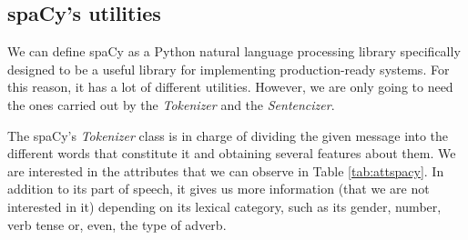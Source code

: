 \subsection{spaCy's utilities}\label{ssect:spacyut}
We can define spaCy as a Python natural language processing library specifically designed to be a useful library for implementing production-ready systems. For this reason, it has a lot of different utilities. However, we are only going to need the ones carried out by the \textit{Tokenizer} and the \textit{Sentencizer}.

The spaCy's \textit{Tokenizer} class is in charge of dividing the given message into the different words that constitute it and obtaining several features about them. We are interested in the attributes that we can observe in Table \ref{tab:attspacy}. In addition to its part of speech, it gives us more information (that we are not interested in it) depending on its lexical category, such as its gender, number, verb tense or, even, the type of adverb.


